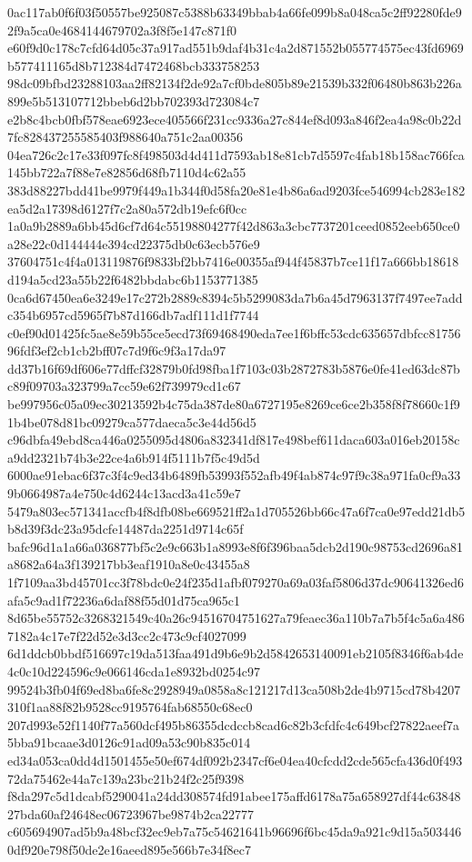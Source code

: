 \documentclass[11pt,a4paper]{article}
\begin{document}
{0ac117ab0f6f03f50557be925087c5388b63349bbab4a66fe099b8a048ca5c2ff92280fde92f9a5ca0e4684144679702a3f8f5e147c871f0
e60f9d0c178c7cfd64d05c37a917ad551b9daf4b31c4a2d871552b055774575ec43fd6969b577411165d8b712384d7472468bcb333758253
98dc09bfbd23288103aa2ff82134f2de92a7cf0bde805b89e21539b332f06480b863b226a899e5b513107712bbeb6d2bb702393d723084c7
e2b8c4bcb0fbf578eae6923ece405566f231cc9336a27c844ef8d093a846f2ea4a98c0b22d7fc828437255585403f988640a751c2aa00356
04ea726c2c17e33f097fc8f498503d4d411d7593ab18e81cb7d5597c4fab18b158ac766fca145bb722a7f88e7e82856d68fb7110d4c62a55
383d88227bdd41be9979f449a1b344f0d58fa20e81e4b86a6ad9203fce546994cb283e182ea5d2a17398d6127f7c2a80a572db19efc6f0cc
1a0a9b2889a6bb45d6cf7d64c55198804277f42d863a3cbc7737201ceed0852eeb650ce0a28e22c0d144444e394cd22375db0c63ecb576e9
37604751c4f4a013119876f9833bf2bb7416e00355af944f45837b7ce11f17a666bb18618d194a5cd23a55b22f6482bbdabc6b1153771385
0ca6d67450ea6e3249e17c272b2889c8394c5b5299083da7b6a45d7963137f7497ee7addc354b6957cd5965f7b87d166db7adf111d1f7744
c0ef90d01425fc5ae8e59b55ce5ecd73f69468490eda7ee1f6bffc53cdc635657dbfcc8175696fdf3ef2cb1cb2bff07c7d9f6c9f3a17da97
dd37b16f69df606e77dffcf32879b0fd98fba1f7103c03b2872783b5876e0fe41ed63dc87bc89f09703a323799a7cc59e62f739979cd1c67
be997956c05a09ec30213592b4c75da387de80a6727195e8269ce6ce2b358f8f78660c1f91b4be078d81bc09279ca577daeca5c3e44d56d5
c96dbfa49ebd8ca446a0255095d4806a832341df817e498bef611daca603a016eb20158ca9dd2321b74b3e22ce4a6b914f5111b7f5c49d5d
6000ae91ebac6f37c3f4c9ed34b6489fb53993f552afb49f4ab874c97f9c38a971fa0cf9a339b0664987a4e750c4d6244c13acd3a41c59e7
5479a803ec571341accfb4f8dfb08be669521ff2a1d705526bb66c47a6f7ca0e97edd21db5b8d39f3dc23a95dcfe14487da2251d9714c65f
bafc96d1a1a66a036877bf5c2e9c663b1a8993e8f6f396baa5dcb2d190c98753cd2696a81a8682a64a3f139217bb3eaf1910a8e0c43455a8
1f7109aa3bd45701cc3f78bdc0e24f235d1afbf079270a69a03faf5806d37dc90641326ed6afa5c9ad1f72236a6daf88f55d01d75ca965c1
8d65be55752c3268321549c40a26c94516704751627a79feaec36a110b7a7b5f4c5a6a4867182a4c17e7f22d52e3d3cc2c473c9cf4027099
6d1ddcb0bbdf516697c19da513faa491d9b6e9b2d5842653140091eb2105f8346f6ab4de4c0c10d224596c9e066146cda1e8932bd0254c97
99524b3fb04f69ed8ba6fe8c2928949a0858a8c121217d13ca508b2de4b9715cd78b4207310f1aa88f82b9528cc9195764fab68550c68ec0
207d993e52f1140f77a560dcf495b86355dcdccb8cad6c82b3cfdfc4c649bcf27822aeef7a5bba91bcaae3d0126c91ad09a53c90b835c014
ed34a053ca0dd4d1501455e50ef674df092b2347cf6e04ea40cfcdd2cde565cfa436d0f49372da75462e44a7c139a23bc21b24f2c25f9398
f8da297c5d1dcabf5290041a24dd308574fd91abee175affd6178a75a658927df44c6384827bda60af24648ec06723967be9874b2ca22777
c605694907ad5b9a48bcf32ec9eb7a75c54621641b96696f6bc45da9a921c9d15a5034460df920e798f50de2e16aeed895e566b7e34f8ec7
}
\end{document}
